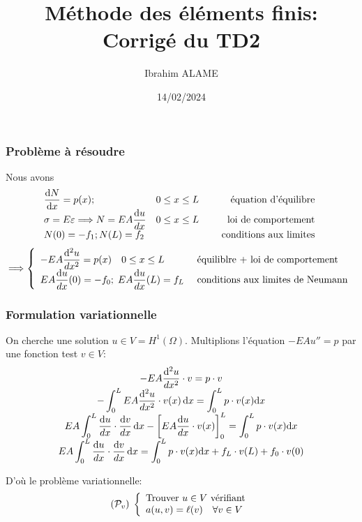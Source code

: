 \documentclass[a4paper]{article}
\title{Méthode des éléments finis: Corrigé du TD2}
\author{Ibrahim ALAME}
\date{14/02/2024}
\def \de {{\rm d}}
\begin{document}
\maketitle



\subsubsection*{Problème à résoudre}
Nous avons
\[
\begin{array}{lcr}
\displaystyle \frac{\de N}{\de x}=p(x);&0\leq x\leq L &\mbox{ équation d'équilibre } \\
\sigma=E\varepsilon\Longrightarrow N=EA\displaystyle \frac{\de u}{dx}& 0\leq x\leq L&\mbox{ loi de comportement } \\
N(0)=-f_1 ;N(L)=f_2&&\quad\mbox{ conditions aux limites } 
\end{array}
\]
\[
\Longrightarrow \left\{
\begin{array}{ll}
-EA\displaystyle \frac{\de^2 u}{dx^2}=p(x)\quad 0\leq x\leq L&\mbox{ équiliblre + loi de comportement } \\
EA\displaystyle \frac{\de u}{dx}(0)=-f_0 ;\;EA\displaystyle \frac{\de u}{dx}(L)=f_L&\mbox{ conditions aux limites de Neumann} 
\end{array}
\right.
\]

\subsubsection*{Formulation variationnelle}
On cherche une solution $u\in V=H^1(\Omega)$. Multiplions l'équation $-EA u''=p$ par une fonction test $v\in V$:
\[
\begin{array}{c}
-\displaystyle EA\frac{\de^2 u}{dx^2}\cdot v=p\cdot v\\
-\displaystyle \int_0^LEA\frac{\de^2 u}{dx^2}\cdot v(x)\,\de x=\int_0^L p\cdot v(x)\de x\\
\displaystyle EA\int_0^L\frac{\de u}{dx}\cdot \frac{\de v}{dx}\,\de x-\left[ EA\frac{\de u}{dx} \cdot v(x)\right]_0^L=\int_0^L p\cdot v(x)\de x\\
\displaystyle EA\int_0^L\frac{\de u}{dx}\cdot \frac{\de v}{dx}\,\de x=\int_0^L p\cdot v(x)\de x+f_L \cdot v(L)+f_0 \cdot v(0)
\end{array}
\]

D'où le problème variationnelle:
\[
({\cal P}_v)\;\left\{
\begin{array}{l}
\mbox{Trouver } u\in V \mbox{ vérifiant}\\
a(u,v)=\ell(v)\quad \forall v\in V
\end{array}
\right.
\]
\end{document}

